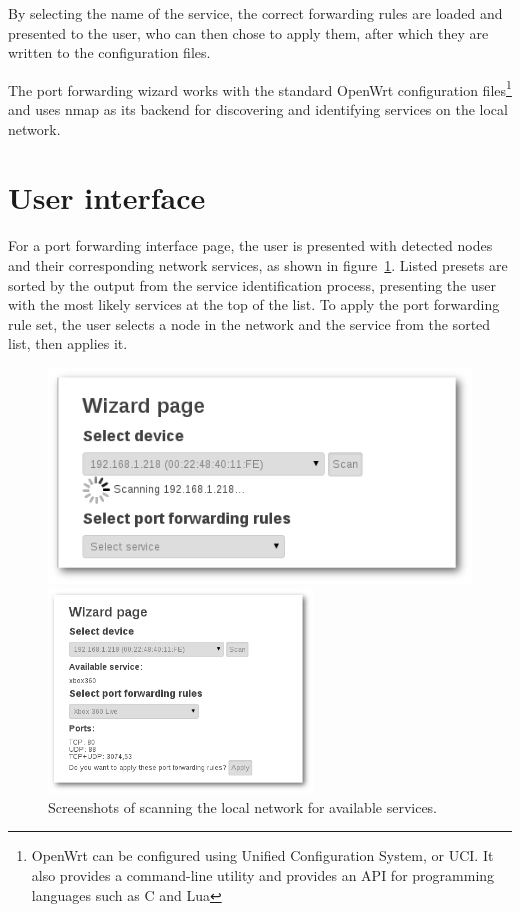 \documentclass[a4paper,11pt,makeidx]{kth-bcs}
\begin{document}
By selecting the name of the service, the correct forwarding rules are loaded and presented to the user, who can then chose to apply them, after which they are written to the configuration files.

The port forwarding wizard works with the standard OpenWrt configuration files\footnote{OpenWrt can be configured using Unified Configuration System, or UCI. It also provides a command-line utility and provides an API for programming languages such as C and Lua} and uses nmap as its backend for discovering and identifying services on the local network.

   \section{User interface}
For a port forwarding interface page, the user is presented with detected nodes and their corresponding network services, as shown in figure~\ref{fig:scannin}.
Listed presets are sorted by the output from the service identification process, presenting the user with the most likely services at the top of the list.
To apply the port forwarding rule set, the user selects a node in the network and the service from the sorted list, then applies it.


\begin{figure}[h]
   \begin{minipage}[b]{0.45\linewidth}
      \centering
      \includegraphics[width=\textwidth]{ss-scanning-shadow}
   \end{minipage}
   \hspace{0.5cm}
   \begin{minipage}[b]{0.45\linewidth}
      \centering
      \includegraphics[width=7cm]{ss-scanned-shadow}
   \end{minipage}
   \caption{Screenshots of scanning the local network for available services.}
   \label{fig:scannin}
\end{figure}
\end{document}
